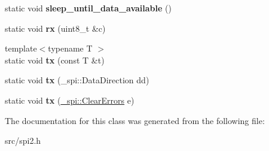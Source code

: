 \begin{DoxyCompactItemize}
static void {\bfseries sleep\+\_\+until\+\_\+data\+\_\+available} ()
\item 
\hypertarget{classSpiAsync_a910512efb3843f9c720672fea2bbaa44}{}\label{classSpiAsync_a910512efb3843f9c720672fea2bbaa44} 
static void {\bfseries rx} (uint8\+\_\+t \&c)
\item 
\hypertarget{classSpiAsync_a64c1c4c56dffff43cb708c654b5e5d1f}{}\label{classSpiAsync_a64c1c4c56dffff43cb708c654b5e5d1f} 
{\footnotesize template$<$typename T $>$ }\\static void {\bfseries tx} (const T \&t)
\item 
\hypertarget{classSpiAsync_aead9b9def923820e34e4333c8f754495}{}\label{classSpiAsync_aead9b9def923820e34e4333c8f754495} 
static void {\bfseries tx} (\+\_\+spi\+::\+Data\+Direction dd)
\item 
\hypertarget{classSpiAsync_a4e51a913230f9ee7e3fcb24939ca0eca}{}\label{classSpiAsync_a4e51a913230f9ee7e3fcb24939ca0eca} 
static void {\bfseries tx} (\hyperlink{class__transmission_1_1ClearErrors}{\+\_\+spi\+::\+Clear\+Errors} e)
\end{DoxyCompactItemize}


The documentation for this class was generated from the following file\+:\begin{DoxyCompactItemize}
\item 
src/spi2.\+h\end{DoxyCompactItemize}
